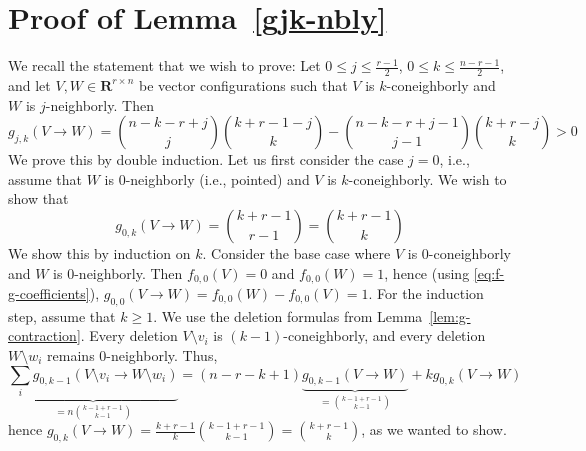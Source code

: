 \documentclass[a4paper,USenglish,cleveref, autoref, thm-restate,nolineno]{socg-lipics-v2021}
\renewcommand{\leq}{\leqslant}
\renewcommand{\geq}{\geqslant}
\newcommand{\R}{\mathbf{R}}
\begin{document}



\appendix
\section{Proof of Lemma~\ref{gjk-nbly}}
\label{sec:proof-gjk-nbly}

We recall the statement that we wish to prove: Let $0\leq j\leq \frac{r-1}{2}$, $0\leq k\leq \frac{n-r-1}{2}$, and let $V,W \in \R^{r\times n}$ be vector configurations such that $V$ is $k$-coneighborly and $W$ is $j$-neighborly. Then 
\begin{equation*}
\textstyle g_{j,k}(V\to W)=\binom{n-k-r+j}{j}\binom{k+r-1-j}{k} - \binom{n-k-r+j-1}{j-1} \binom{k+r-j}{k} > 0
\end{equation*}
We prove this by double induction. Let us first consider the case $j=0$, i.e., assume that $W$ is $0$-neighborly (i.e., pointed) and $V$ is $k$-coneighborly. We wish to show that
\begin{equation}
\label{eq:g0k-nbly}
g_{0,k}(V\to W)=\binom{k+r-1}{r-1}=\binom{k+r-1}{k}
\end{equation}
We show this by induction on $k$. Consider the base case where $V$ is $0$-coneighborly and $W$ is $0$-neighborly. Then $f_{0,0}(V)=0$ and $f_{0,0}(W)=1$, hence (using  \eqref{eq:f-g-coefficients}), $g_{0,0}(V\to W)=f_{0,0}(W)-f_{0,0}(V)=1$. 
For the induction step, assume that $k\geq 1$. We use the deletion formulas from Lemma~\ref{lem:g-contraction}. Every deletion $V\setminus v_i$ is $(k-1)$-coneighborly, and every deletion $W\setminus w_i$ remains $0$-neighborly. Thus,
\[
\underbrace{\sum_i g_{0,k-1}(V\setminus v_i \to W\setminus w_i)}_{=n\binom{k-1+r-1}{k-1}}=(n-r-k+1)\underbrace{g_{0,k-1}(V\to W)}_{=\binom{k-1+r-1}{k-1}} + k g_{0,k}(V\to W)
\]
hence $g_{0,k}(V\to W)=\frac{k+r-1}{k}\binom{k-1+r-1}{k-1}=\binom{k+r-1}{k}$, as we wanted to show.
\end{document}
